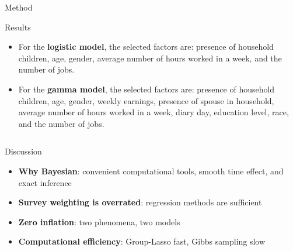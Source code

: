 \documentclass[final]{beamer}
\newcounter{acolumn}%
\def\autoheight{\vspace*{0pt}}%
\begin{document}
\begin{frame}
\begin{acolumns}[t]
\begin{column}{.24\linewidth}
\begin{block}{Method}
                     
     \end{block}
          
          
     \begin{block}{Results}
        \begin{itemize}
        	\item For the \textbf{logistic model}, the selected factors are: presence of household children, age, gender, average number of hours worked in a week, and the number of jobs.
        	
        	\item For the \textbf{gamma model}, the selected factors are: presence of household children, age, gender, weekly earnings, presence of spouse in household, average number of hours worked in a week, diary day, education level, race, and the number of jobs.
        \end{itemize}
       \autoheight                   
     \end{block}
     
        
    \end{column}
    
    
    \end{acolumns}
    
    \vfill
    
        \begin{acolumns}[t]
        
        \begin{column}{.24\linewidth}
        		
                 
                 \begin{block}{Discussion}
                 	\begin{itemize}
                 		\item \textbf{Why Bayesian}: convenient computational tools, smooth time effect, and exact inference
                 		
                 		\item \textbf{Survey weighting is overrated}: regression methods are sufficient
                 		
                 		\item \textbf{Zero inflation}: two phenomena, two models
                 		
                 		\item \textbf{Computational efficiency}: Group-Lasso fast, Gibbs sampling slow
                 	\end{itemize}
                  \autoheight   
                 \end{block}
                              

\end{column}
\end{acolumns}
\end{frame}
\end{document}
